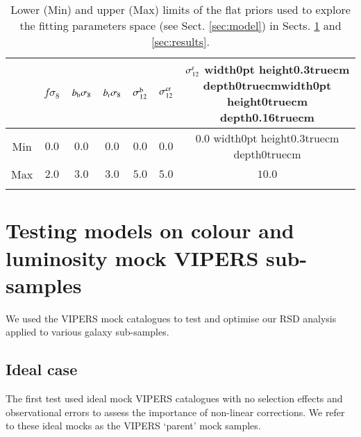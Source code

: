 \documentclass[longauth]{aa}
\newcommand*\bb{b_{\rm{b}}\sigma_8}
\newcommand*\br{b_{\rm{r}}\sigma_8}
\def\bigstrutup{\vrule width0pt height0.3truecm depth0truecm}
\def\bigstrutdown{\vrule width0pt height0truecm depth0.16truecm}
\begin{document}
	\begin{table}
		\scriptsize
                \begin{center}
				\begin{tabular}{	c				c				c				c					c						c			c		}
                               \hline
                               \hline
										&		$f\sigma_8$	&	$\bb$	&		$\br$		&	$\sigma_{12}^{\rm{b}}$		&	$\sigma_{12}^{\rm{cr}}$		&	$\sigma_{12}^{\rm{r}}$	\bigstrutup\bigstrutdown	\\
                                \hline
						Min				&		$0.0$		&	$0.0$	&		$0.0$		&	$0.0$						&		$0.0$		&	$0.0$	\bigstrutup	\\
						Max				&		$2.0$		&	$3.0$	&		$3.0$		&	$5.0$						&		$5.0$		&	$10.0$\\
                                \hline
                                \hline
                                \\
                        \end{tabular}
                \caption{Lower (Min) and upper (Max) limits of the flat priors used to explore the fitting parameters space (see Sect. \ref{sec:model}) in Sects. \ref{sec:tests} and \ref{sec:results}.}\label{tab:mcmc_priors}
                \end{center}
        \end{table}











\section{Testing models on colour and luminosity mock VIPERS sub-samples}		\label{sec:tests}									%

We used the VIPERS mock catalogues to test and optimise our RSD analysis applied to various galaxy sub-samples.

\subsection{Ideal case}					\label{sec:fit_ideal}
The first test used ideal mock VIPERS catalogues with no selection effects and observational errors to assess the importance of non-linear corrections. We refer to these ideal mocks as the VIPERS `parent' mock samples.
\end{document}
